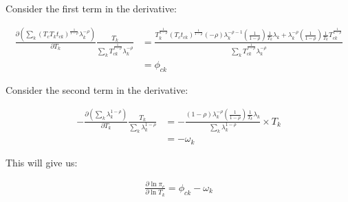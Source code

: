 \documentclass[10pt]{article}
\begin{document}
Consider the first term in the derivative:

\begin{align*}
    \frac{\partial \left( \sum_{k}^{} (T_c T_k t_{ck})^{\frac{1}{1 - \rho}} \lambda_k^{- \rho} \right)}{\partial T_k} \frac{T_k}{\sum_{k}^{} T_{ck}^{\frac{1}{1 - \rho}} \lambda_k^{- \rho}} & = \frac{T_k^{\frac{1}{1 - \rho}} (T_c t_{ck})^{\frac{1}{1 - \rho}} (- \rho) \lambda_k^{- \rho - 1} \left( \frac{1}{1 - \rho} \right) \frac{1}{T_k} \lambda_k + \lambda_k^{- \rho} \left( \frac{1}{1 - \rho} \right) \frac{1}{T_k} T_{ck}^{\frac{1}{1 - \rho}}}{\sum_{k}^{} T_{ck}^{\frac{1}{1 - \rho}} \lambda_k^{- \rho}} \\
                                                                                                                                                                                             & = \phi_{ck}
\end{align*}

Consider the second term in the derivative:

\begin{align*}
    - \frac{\partial \left( \sum_{k}^{} \lambda_k^{1 - \rho} \right)}{\partial T_k} \frac{T_k}{\sum_{k}^{} \lambda_k^{1 - \rho}} & = - \frac{(1 - \rho) \lambda_k^{- \rho} \left( \frac{1}{1 - \rho} \right) \frac{1}{T_k} \lambda_k}{\sum_{k}^{} \lambda_k^{1 - \rho}} \times T_k \\
                                                                                                                                 & = - \omega_k
\end{align*}

This will give us:

\begin{align*}
    \frac{\partial \ln \pi_c}{\partial \ln T_k} = \phi_{ck} - \omega_k
\end{align*}
\end{document}
